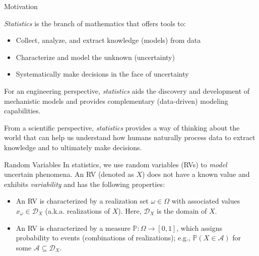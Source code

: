 \documentclass[9pt]{beamer}
\begin{document}
\begin{frame}{Motivation}

{\em Statistics} is the branch of mathematics that offers tools to: 
\begin{itemize}
\item Collect, analyze, and extract knowledge (models) from data 
\item Characterize and model the unknown (uncertainty) 
\item Systematically make decisions in the face of uncertainty
\end{itemize}

\begin{block}{}
For an engineering perspective, {\em statistics} aids the discovery and development of mechanistic models and provides complementary (data-driven) modeling capabilities.  
\end{block}

\begin{block}{}
From a scientific perspective, {\em statistics} provides a way of thinking about the world that can help us understand how humans naturally process data to extract knowledge and to ultimately make decisions. 
\end{block}
\end{frame}
%
\begin{frame}{Random Variables}
In statistics, we use random variables (RVs) to {\em model} uncertain phenomena. An RV (denoted as $X$) does not have a known value and exhibits {\em variability} and has the following properties: 
\begin{block}{}
\begin{itemize}
\item An RV is characterized by a realization set $\omega \in \Omega$ with associated values $x_\omega\in \mathcal{D}_X$ (a.k.a. realizations of $X$).  Here, $\mathcal{D}_X$ is the domain of $X$.
\item An RV is characterized by a measure $\mathbb{P}:\Omega\to [0,1]$, which assigns probability to events (combinations of realizations); e.g., $\mathbb{P}(X\in \mathcal{A})$ for some $\mathcal{A}\subseteq \mathcal{D}_X$.
\end{itemize}
\end{block}
\end{frame}
\end{document}

